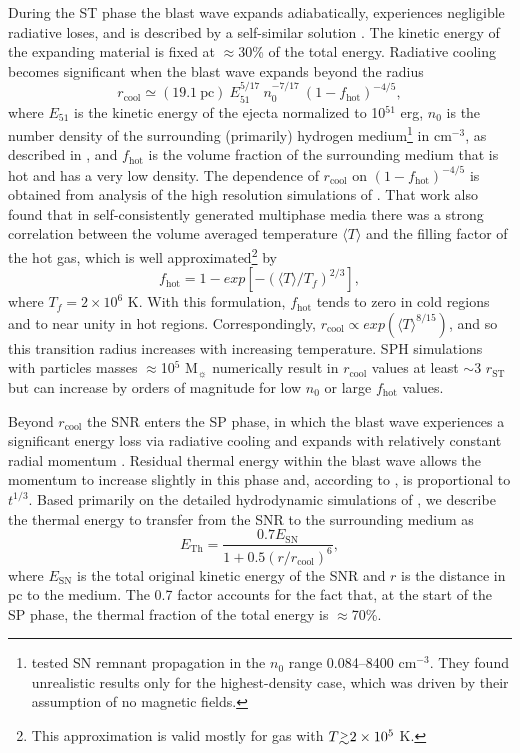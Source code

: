 \documentclass[iop]{emulateapj}
\newcommand{\gapprox }{{\lower0.8ex\hbox{$\buildrel >\over\sim$}}}
\begin{document}
During the ST phase the blast wave expands adiabatically, experiences negligible radiative loses, and is described by a self-similar solution \citep{Taylor50, Sedov59, Bandiera84}. The kinetic energy of the expanding material is fixed at $\approx$30\% of the total energy. Radiative cooling becomes significant when the blast wave expands beyond the radius
\begin{equation}\label{STradius}
  r_{\mathrm{cool}} \simeq (19.1\ \textrm{pc})\ E_{51}^{5/17}\ n_0^{-7/17}\ (1-f_{\mathrm{hot}})^{-4/5},
\end{equation}
where $E_{51}$ is the kinetic energy of the ejecta normalized to 10$^{51}$ erg, $n_0$ is the number density of the surrounding (primarily) hydrogen medium\footnote{\citet{Blondin98} tested SN remnant propagation in the $n_0$ range 0.084--8400 cm$^{-3}$. They found unrealistic results only for the highest-density case, which was driven by their assumption of no magnetic fields.} in cm$^{-3}$, as described in \citet{Blondin98}, and $f_{\mathrm{hot}}$ is the volume fraction of the surrounding medium that is hot and has a very low density. The dependence of $r_{\mathrm{cool}}$ on $(1-f_{\mathrm{hot}})^{-4/5}$ is obtained from analysis of the high resolution simulations of \citet{Li15}. That work also found that in self-consistently generated multiphase media there was a strong correlation between the volume averaged temperature $\langle T\rangle$ and the filling factor of the hot gas, which is well approximated\footnote{This approximation is valid mostly for gas with $T \gapprox 2\times 10^5$ K.} by
\begin{equation}\label{fhot}
  f_{\mathrm{hot}} = 1 - exp[- (\langle T\rangle / T_f)^{2/3}],
\end{equation}
where $T_f=2\times10^6$ K. With this formulation, $f_{\mathrm{hot}}$ tends to zero in cold regions and to near unity in hot regions. Correspondingly, $r_{\mathrm{cool}}\propto exp(\langle T\rangle^{8/15})$, and so this transition radius increases with increasing temperature. SPH simulations with particles masses $\approx$10$^5$ M$_{\sun}$ numerically result in $r_{\mathrm{cool}}$ values at least $\sim$3 $r_{\mathrm{ST}}$ but can increase by orders of magnitude for low $n_0$ or large $f_{\mathrm{hot}}$ values.

Beyond $r_{\mathrm{cool}}$ the SNR enters the SP phase, in which the blast wave experiences a significant energy loss via radiative cooling and expands with relatively constant radial momentum \citep{Cox72, Cioffi88, Petruk06}. Residual thermal energy within the blast wave allows the momentum to increase slightly in this phase and, according to \citet{Blondin98}, is proportional to $t^{1/3}$. Based primarily on the detailed hydrodynamic simulations of \citet{Li15}, we describe the thermal energy to transfer from the SNR to the surrounding medium as
\begin{equation}\label{E_Th}
  E_{\mathrm{Th}} = \frac{0.7 E_{\mathrm{SN}}}{1 + 0.5(r / r_{\mathrm{cool}})^6},
\end{equation}
where $E_{\mathrm{SN}}$ is the total original kinetic energy of the SNR and $r$ is the distance in pc to the medium. The 0.7 factor accounts for the fact that, at the start of the SP phase, the thermal fraction of the total energy is $\approx$70\%.
\end{document}
